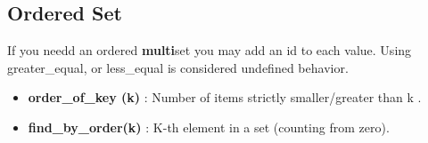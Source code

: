\subsection{Ordered Set}
 
If you needd an ordered \textbf{multi}set you may add an id to each value. Using greater\_equal, or less\_equal is considered undefined behavior.

\begin{itemize}
  \item  \textbf{order\_of\_key (k)} : Number of items strictly smaller/greater than k .
  \item  \textbf{find\_by\_order(k)} : K-th element in a set (counting from zero). 
\end{itemize}

